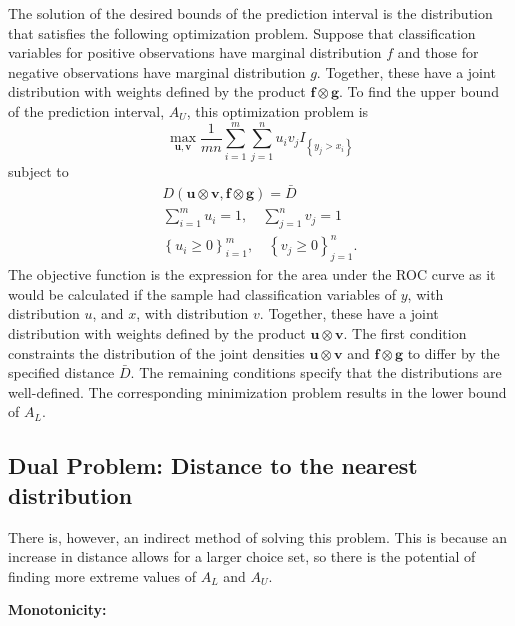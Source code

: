 The solution of the desired bounds of the prediction interval is the distribution that satisfies the following optimization problem.
Suppose that classification variables for positive observations have marginal distribution $f$ and those for negative observations have marginal distribution $g$.
Together, these have a joint distribution with weights defined by the product $\mathbf{f} \otimes \mathbf{g}$.
%
To find the upper bound of the prediction interval, $A_U$, this optimization problem is
%
\begin{equation}
    \max_{\mathbf{u}, \mathbf{v}} \frac{1}{m n} \sum_{i = 1}^{m} \sum_{j = 1}^{n} u_i v_j I_{\left\{ y_j > x_i \right\}}
\end{equation}
%
\noindent subject to
\begin{align}
    D(\mathbf{u} \otimes \mathbf{v}, \mathbf{f} \otimes \mathbf{g}) = \bar{D} \\
    \sum_{i = 1}^{m} u_i = 1, \quad \sum_{j = 1}^{n} v_j = 1 \\
    \left\{ u_i  \geq 0 \right\}_{i=1}^{m}, \quad \left\{ v_j \geq 0 \right\}_{j=1}^{n}.
\end{align}
%
\noindent The objective function is the expression for the area under the ROC curve as it would be calculated if the sample had classification variables of $y$, with distribution $u$, and $x$, with distribution $v$.
Together, these have a joint distribution with weights defined by the product $\mathbf{u} \otimes \mathbf{v}$.
The first condition constraints the distribution of the joint densities $\mathbf{u} \otimes \mathbf{v}$ and $\mathbf{f} \otimes \mathbf{g}$ to differ by the specified distance $\bar{D}$.
%
The remaining conditions specify that the distributions are well-defined.
%
The corresponding minimization problem results in the lower bound of $A_L$.





\subsection{Dual Problem: Distance to the nearest distribution}

There is, however, an indirect method of solving this problem.
This is because an increase in distance allows for a larger choice set, so there is the potential of finding more extreme values of $A_L$ and  $A_U$.

\textbf{Monotonicity:}

